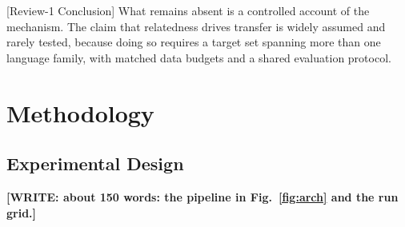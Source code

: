 \documentclass[conference]{IEEEtran}
\newcommand{\WRITE}[1]{{\color{red}\textbf{[WRITE: #1]}}}
\begin{document}
[Review-1 Conclusion] What remains absent is a controlled account of the
mechanism. The claim that relatedness drives transfer is widely assumed
and rarely tested, because doing so requires a target set spanning more
than one language family, with matched data budgets and a shared
evaluation protocol.
\fi

\section{Methodology}

\subsection{Experimental Design}

\WRITE{about 150 words: the pipeline in Fig.~\ref{fig:arch} and the run grid.}
\end{document}
